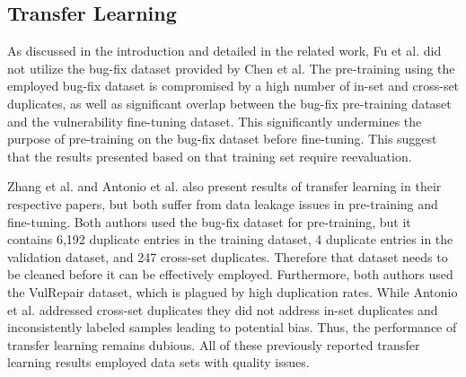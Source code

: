 










\subsection{Transfer Learning}\label{TransferLearning}
As discussed in the introduction and detailed in the related work, Fu et al.\cite{fu2024vision} did not utilize the bug-fix dataset provided by Chen et al.\cite{chen2022neural} 
The pre-training using the employed bug-fix dataset is compromised by a high number of in-set and cross-set duplicates, as well as significant overlap between the bug-fix pre-training dataset and the vulnerability fine-tuning dataset. 
This significantly undermines the purpose of pre-training on the bug-fix dataset before fine-tuning. This suggest that the results presented based on that training set require reevaluation.

Zhang et al.\cite{zhang2023pre} and Antonio et al.\cite{mastropaolo2024training} also present results of transfer learning in their respective papers, but both suffer from data leakage issues in pre-training and fine-tuning.
Both authors used the bug-fix dataset for pre-training, but it contains 6,192 duplicate entries in the training dataset, 4 duplicate entries in the validation dataset, and 247 cross-set duplicates.
Therefore that dataset needs to be cleaned before it can be effectively employed.
Furthermore, both authors used the VulRepair dataset, which is plagued by high duplication rates.
While Antonio et al. addressed cross-set duplicates they did not address in-set duplicates and inconsistently labeled samples leading to potential bias.
Thus, the  performance of transfer learning remains dubious.
All of these previously reported transfer learning results employed data sets with quality issues.

